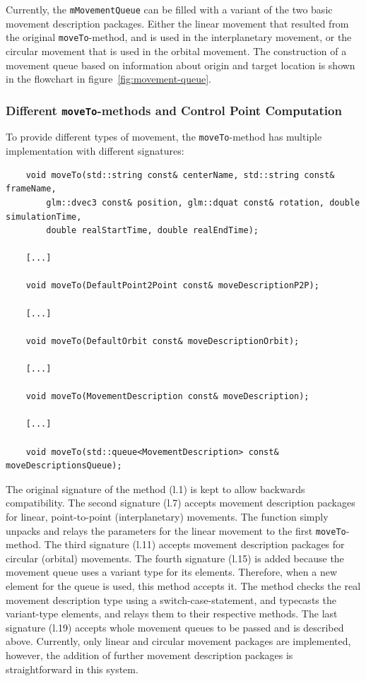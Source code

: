Currently, the \texttt{mMovementQueue} can be filled with a variant of the two basic movement description
packages.
Either the linear movement that resulted from the original \texttt{moveTo}-method, and is used in the
interplanetary movement, or the circular movement that is used in the orbital movement.
The construction of a movement queue based on information about origin and target location is shown in the
flowchart in figure~\ref{fig:movement-queue}.

\subsubsection{Different \texttt{moveTo}-methods and Control Point Computation}\label{subsubsec:different-moveto-methods-and-control-point-computation}

To provide different types of movement, the \texttt{moveTo}-method has multiple implementation with different
signatures:
\begin{verbatim}
    void moveTo(std::string const& centerName, std::string const& frameName,
        glm::dvec3 const& position, glm::dquat const& rotation, double simulationTime,
        double realStartTime, double realEndTime);

    [...]

    void moveTo(DefaultPoint2Point const& moveDescriptionP2P);

    [...]

    void moveTo(DefaultOrbit const& moveDescriptionOrbit);

    [...]

    void moveTo(MovementDescription const& moveDescription);

    [...]

    void moveTo(std::queue<MovementDescription> const& moveDescriptionsQueue);
\end{verbatim}
The original signature of the method (l.\@1) is kept to allow backwards compatibility.
The second signature (l.\@7) accepts movement description packages for linear, point-to-point (interplanetary)
movements.
The function simply unpacks and relays the parameters for the linear movement to the first \texttt{moveTo}-method.
The third signature (l.\@11) accepts movement description packages for circular (orbital) movements.
The fourth signature (l.\@15) is added because the movement queue uses a variant type for its elements.
Therefore, when a new element for the queue is used, this method accepts it.
The method checks the real movement description type using a switch-case-statement, and typecasts the variant-type
elements, and relays them to their respective methods.
The last signature (l.\@19) accepts whole movement queues to be passed and is described above.
Currently, only linear and circular movement packages are implemented, however, the addition of further movement
description packages is straightforward in this system.

